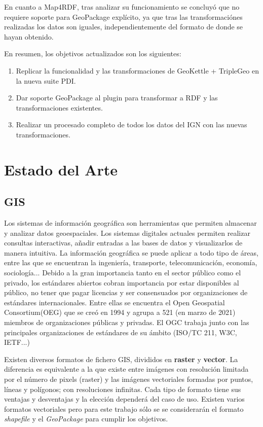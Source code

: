 En cuanto a Map4RDF, tras analizar su funcionamiento se concluyó que no requiere soporte para GeoPackage
explícito, ya que tras las transformaciónes realizadas los datos son iguales, independientemente del formato de
donde se hayan obtenido.

En resumen, los objetivos actualizados son los siguientes:
\begin{enumerate} 
    \item Replicar la funcionalidad y las transformaciones de GeoKettle + TripleGeo en la nueva suite PDI. 
    \item Dar soporte GeoPackage al plugin para transformar a RDF y las transformaciones existentes.
    \item Realizar un procesado completo de todos los datos del IGN con las nuevas transformaciones.
\end{enumerate}

\section{Estado del Arte}

\subsection{GIS} Los sistemas de información geográfica son herramientas que permiten almacenar y analizar datos
geoespaciales. Los sistemas digitales actuales permiten realizar consultas interactivas, añadir entradas a las
bases de datos y visualizarlos de manera intuitiva. La información geográfica se puede aplicar a todo tipo de
áreas, entre las que se encuentran la ingeniería, transporte, telecomunicación, economía, sociología... Debido a
la gran importancia tanto en el sector público como el privado\cite{gis-standards}, los estándares abiertos
cobran importancia por estar disponibles al público, no tener que pagar licencias y ser consensuados por
organizaciones de estándares internacionales. Entre ellas se encuentra el Open Geospatial Consortium(OEG) que se creó
en 1994 y agrupa a 521 (en marzo de 2021) miembros de organizaciones públicas y privadas.\cite{ogc-members}
El OGC trabaja junto con las principales organizaciones de estándares de su ámbito (ISO/TC 211, W3C,
IETF...) \cite{ogc-whitepaper}

Existen diversos formatos de fichero GIS, divididos en \textbf{raster} y \textbf{vector}. La diferencia es
equivalente a la que existe entre imágenes con resolución limitada por el número de pixels (raster) y las 
imágenes vectoriales formadas por puntos, líneas y polígonos; con resoluciones infinitas. Cada tipo de formato
tiene sus ventajas y desventajas y la elección dependerá del caso de uso. Existen varios formatos vectoriales
pero para este trabajo sólo se se considerarán el formato \textit{shapefile} y el \textit{GeoPackage} para cumplir
los objetivos.

